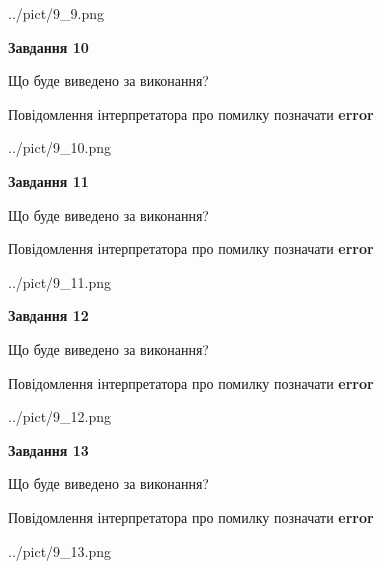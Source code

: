 \documentclass[11pt, ukrainian]{article}
\begin{document}
{\begin {large}
\begin{center}
	{../pict/9_9.png}
\end{center}
\newpage

{\begin {center}\textbf{Завдання 10}\end {center}}\par
Що буде виведено за виконання? \par
Повідомлення інтерпретатора про помилку позначати \textbf{error}

\begin{center}
	{../pict/9_10.png}
\end{center}
\newpage

{\begin {center}\textbf{Завдання 11}\end {center}}\par
Що буде виведено за виконання? \par
Повідомлення інтерпретатора про помилку позначати \textbf{error}

\begin{center}
	{../pict/9_11.png}
\end{center}
\newpage

{\begin {center}\textbf{Завдання 12}\end {center}}\par
Що буде виведено за виконання? \par
Повідомлення інтерпретатора про помилку позначати \textbf{error}

\begin{center}
	{../pict/9_12.png}
\end{center}
\newpage

{\begin {center}\textbf{Завдання 13}\end {center}}\par
Що буде виведено за виконання? \par
Повідомлення інтерпретатора про помилку позначати \textbf{error}

\begin{center}
	{../pict/9_13.png}
\end{center}
\newpage


\end{large}}
\end{document}
